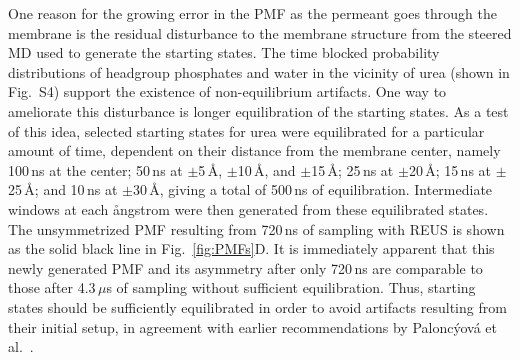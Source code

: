   \par One reason for the growing error in the PMF as the permeant goes through the membrane is the residual disturbance to the membrane structure from the steered MD used to generate the starting states. The time blocked probability distributions of headgroup phosphates and water in the vicinity of urea (shown in Fig.~S4) support the existence of non-equilibrium artifacts. One way to ameliorate this disturbance is longer equilibration of the starting states.  As a test of this idea, selected starting states for urea were equilibrated for a particular amount of time, dependent on their distance from the membrane center, namely 100\,ns at the center; 50\,ns at
  $\pm$5\,\AA, $\pm$10\,\AA, and $\pm$15\,\AA; 25\,ns at $\pm$20\,\AA; 15\,ns at $\pm$25\,\AA; and 10\,ns at $\pm$30\,\AA,
  giving a total of 500\,ns of equilibration.  Intermediate windows at each \aa ngstrom were then generated from these equilibrated states.  The unsymmetrized PMF resulting from 720\,ns of sampling with REUS is shown as the solid black line in Fig.~\ref{fig:PMFs}D.  It is immediately apparent that this newly generated PMF and its asymmetry after only 720\,ns are comparable to those after 4.3\,$\mu$s of sampling without sufficient equilibration.
 Thus,
 starting states should be sufficiently equilibrated in order to avoid artifacts resulting from their initial setup, {\color{red} in agreement with earlier recommendations by Palonc{\'{y}}ov{\'{a}} et al.~\cite{Paloncyova2012}.}




